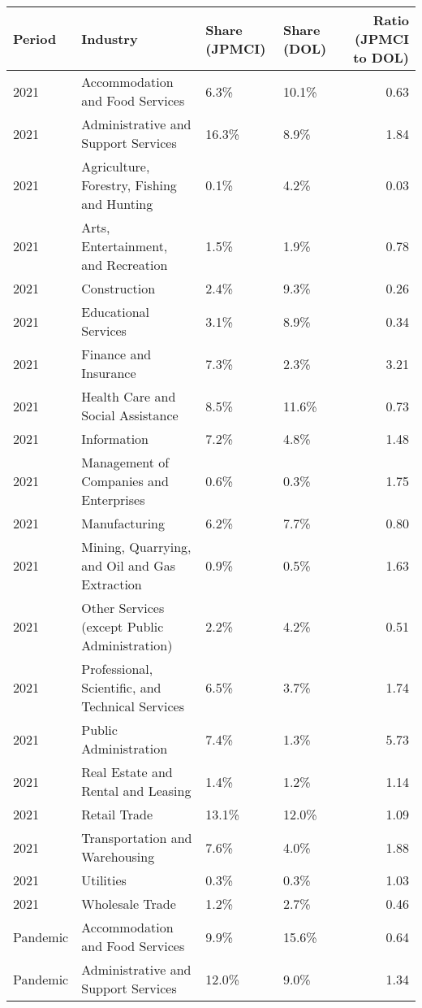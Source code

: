 \begin{tabular}{llllr}
  \hline
Period & Industry & Share (JPMCI) & Share (DOL) & Ratio (JPMCI to DOL) \\ 
  \hline
2021 & Accommodation and Food Services & 6.3\% & 10.1\% & 0.63 \\ 
  2021 & Administrative and Support Services & 16.3\% & 8.9\% & 1.84 \\ 
  2021 & Agriculture, Forestry, Fishing and Hunting & 0.1\% & 4.2\% & 0.03 \\ 
  2021 & Arts, Entertainment, and Recreation & 1.5\% & 1.9\% & 0.78 \\ 
  2021 & Construction & 2.4\% & 9.3\% & 0.26 \\ 
  2021 & Educational Services & 3.1\% & 8.9\% & 0.34 \\ 
  2021 & Finance and Insurance & 7.3\% & 2.3\% & 3.21 \\ 
  2021 & Health Care and Social Assistance & 8.5\% & 11.6\% & 0.73 \\ 
  2021 & Information & 7.2\% & 4.8\% & 1.48 \\ 
  2021 & Management of Companies and Enterprises & 0.6\% & 0.3\% & 1.75 \\ 
  2021 & Manufacturing & 6.2\% & 7.7\% & 0.80 \\ 
  2021 & Mining, Quarrying, and Oil and Gas Extraction & 0.9\% & 0.5\% & 1.63 \\ 
  2021 & Other Services (except Public Administration) & 2.2\% & 4.2\% & 0.51 \\ 
  2021 & Professional, Scientific, and Technical Services & 6.5\% & 3.7\% & 1.74 \\ 
  2021 & Public Administration & 7.4\% & 1.3\% & 5.73 \\ 
  2021 & Real Estate and Rental and Leasing & 1.4\% & 1.2\% & 1.14 \\ 
  2021 & Retail Trade & 13.1\% & 12.0\% & 1.09 \\ 
  2021 & Transportation and Warehousing & 7.6\% & 4.0\% & 1.88 \\ 
  2021 & Utilities & 0.3\% & 0.3\% & 1.03 \\ 
  2021 & Wholesale Trade & 1.2\% & 2.7\% & 0.46 \\ 
  Pandemic & Accommodation and Food Services & 9.9\% & 15.6\% & 0.64 \\ 
  Pandemic & Administrative and Support Services & 12.0\% & 9.0\% & 1.34 \\ 

\end{tabular}
